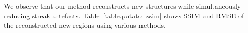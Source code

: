 \documentclass[journal]{IEEEtran}
\begin{document}
We observe
that our method reconstructs new structures while simultaneously
reducing streak artefacts. Table~\ref{table:potato_ssim} shows SSIM and RMSE of
the reconstructed new regions using various methods. 

\end{document}
